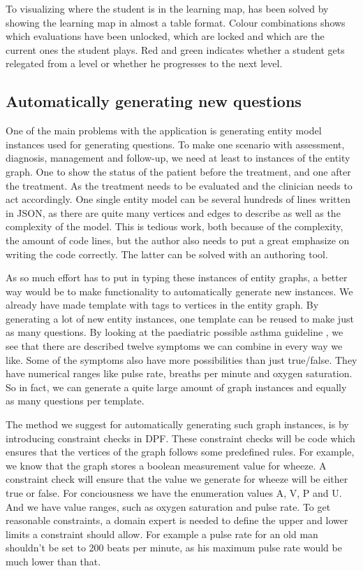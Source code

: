 To visualizing where the student is in the learning map, has been solved by showing the learning map in almost a table format. Colour combinations shows which evaluations have been unlocked, which are locked and which are the current ones the student plays. Red and green indicates whether a student gets relegated from a level or whether he progresses to the next level.	



 
\subsection{Automatically generating new questions}
One of the main problems with the application is generating entity model instances used for generating questions. To make one scenario with assessment, diagnosis, management and follow-up, we need at least to instances of the entity graph. One to show the status of the patient before the treatment, and one after the treatment. As the treatment needs to be evaluated and the clinician needs to act accordingly. One single entity model can be several hundreds of lines written in JSON, as there are quite many vertices and edges to describe as well as the complexity of the model. This is tedious work, both because of the complexity, the amount of code lines, but the author also needs to put a great emphasize on writing the code correctly. The latter can be solved with an authoring tool.

As so much effort has to put in typing these instances of entity graphs, a better way would be to make functionality to automatically generate new instances. We already have made template with tags to vertices in the entity graph. By generating a lot of new entity instances, one template can be reused to make just as many questions. By looking at the paediatric possible asthma guideline \parencite{RepublicofKeny2016}, we see that there are described twelve symptoms we can combine in every way we like. Some of the symptoms also have more possibilities than just true/false. They have numerical ranges like pulse rate, breaths per minute and oxygen saturation. So in fact, we can generate a quite large amount of graph instances and equally as many questions per template.



The method we suggest for automatically generating such graph instances, is by introducing constraint checks in DPF. These constraint checks will be code which ensures that the vertices of the graph follows some predefined rules. For example, we know that the graph stores a boolean measurement value for wheeze. A constraint check will ensure that the value we generate for wheeze will be either true or false. For conciousness we have the enumeration values A, V, P and U. And we have value ranges, such as oxygen saturation and pulse rate. To get reasonable  constraints, a domain expert is needed to define the upper and lower limits a constraint should allow. For example a pulse rate for an old man shouldn't be set to 200 beats per minute, as his maximum pulse rate would be much lower than that.

